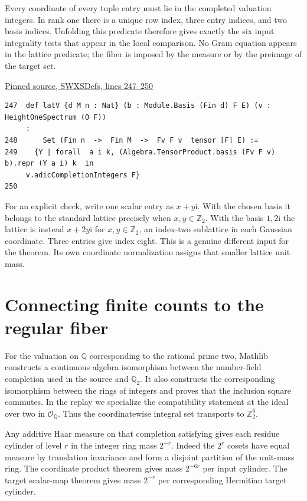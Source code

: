 \documentclass[12pt,letterpaper]{article}
\newcommand{\code}[1]{\texttt{\detokenize{#1}}}
\begin{document}
Every coordinate of every tuple entry must lie in the completed valuation integers. In rank one there is a unique row index, three entry indices, and two basis indices. Unfolding this predicate therefore gives exactly the six input integrality tests that appear in the local comparison. No Gram equation appears in the lattice predicate; the fiber is imposed by the measure or by the preimage of the target set.

\par\smallskip\href{https://github.com/nousentllc/riemann-hypothesis/blob/40e56bab026552e089d7afcfeff08d2defb9c005/src/Formalism/UnipotentAdelicQuotients/SWXSDefs.lean#L247-L250}{\sffamily\small Pinned source, SWXSDefs, lines 247--250}\par

{\footnotesize\begin{verbatim}
247  def latV {d M n : Nat} (b : Module.Basis (Fin d) F E) (v : HeightOneSpectrum (O F))
     :
248      Set (Fin n  ->  Fin M  ->  Fv F v  tensor [F] E) :=
249    {Y | forall  a i k, (Algebra.TensorProduct.basis (Fv F v) b).repr (Y a i) k  in
     v.adicCompletionIntegers F}
250  
\end{verbatim}
}

For an explicit check, write one scalar entry as \(x+y\mathrm i\). With the chosen basis it belongs to the standard lattice precisely when \(x,y\in\mathbb Z_2\). With the basis \(1,2\mathrm i\) the lattice is instead \(x+2y\mathrm i\) for \(x,y\in\mathbb Z_2\), an index-two sublattice in each Gaussian coordinate. Three entries give index eight. This is a genuine different input for the theorem. Its own coordinate normalization assigns that smaller lattice unit mass.

\clearpage\section{Connecting finite counts to the regular fiber}
For the valuation on \(\mathbb Q\) corresponding to the rational prime two, Mathlib constructs a continuous algebra isomorphism between the number-field completion used in the source and \(\mathbb Q_2\). It also constructs the corresponding isomorphism between the rings of integers and proves that the inclusion square commutes. In the replay we specialize the compatibility statement at the ideal over two in \(\mathcal O_{\mathbb Q}\). Thus the coordinatewise integral set transports to \(\mathbb Z_2^6\).

Any additive Haar measure on that completion satisfying \code{IsStdV} gives each residue cylinder of level \(r\) in the integer ring mass \(2^{-r}\). Indeed the \(2^r\) cosets have equal measure by translation invariance and form a disjoint partition of the unit-mass ring. The coordinate product theorem gives mass \(2^{-6r}\) per input cylinder. The target scalar-map theorem gives mass \(2^{-r}\) per corresponding Hermitian target cylinder.
\end{document}
